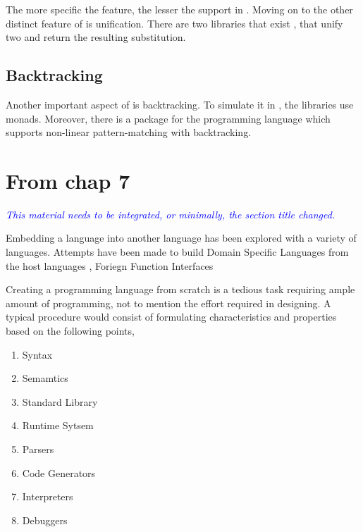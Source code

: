 \documentclass[thesis-solanki.tex]{subfiles}
\begin{document}
The more specific the feature{\Large,} the lesser the support in .
Moving on to the other distinct feature of  is unification.
There are two libraries that exist \cite{unification-fd-lib},
\cite{cmu-lib} that unify two   and return the resulting
substitution.


\subsection{Backtracking}

Another important aspect of  is backtracking.
To simulate it in , the libraries \cite{stream-monad-lib, logicst-lib} use monads.
Moreover, there is a package for the  programming language \cite{egison-lib} which supports
non-linear pattern-matching with backtracking.





\section{\textbf{From chap 7}}

\textcolor{blue}{\itshape This material needs to be integrated, or minimally, the section title changed.}

Embedding a language into another language has been explored with a variety of languages.
Attempts have been made to build Domain Specific Languages from the host languages \cite{hudak1996building},
Foriegn Function Interfaces \cite{barzilay2004foreign}

Creating a programming language from scratch is a tedious task requiring ample
amount of programming, not to
mention the effort required in designing.
A typical procedure would consist of formulating characteristics and properties based on the following points,

\begin{enumerate}
\item Syntax
\item Semamtics
\item Standard Library
\item Runtime Sytsem
\item Parsers
\item Code Generators
\item Interpreters
\item Debuggers
\end{enumerate}
\end{document}
